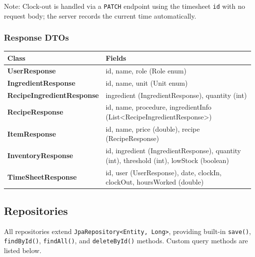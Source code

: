 \documentclass[12pt]{article}
\newcommand{\headerrow}{\rowcolor{darkblue}\color{white}\bfseries}
\begin{document}
\textcolor{midgray}{\small Note: Clock-out is handled via a \texttt{PATCH} endpoint using the timesheet \texttt{id} with no request body; the server records the current time automatically.}

\vspace{1em}

\subsubsection*{Response DTOs}

\begin{longtable}{>{\bfseries\ttfamily}p{5.2cm} p{8cm}}
\toprule
\headerrow Class & Fields \\
\midrule
\endhead
\rowcolor{lightgray} UserResponse & id, name, role (Role enum) \\
IngredientResponse & id, name, unit (Unit enum) \\
\rowcolor{lightgray} RecipeIngredientResponse & ingredient (IngredientResponse), quantity (int) \\
RecipeResponse & id, name, procedure, ingredientInfo (List\textless RecipeIngredientResponse\textgreater) \\
\rowcolor{lightgray} ItemResponse & id, name, price (double), recipe (RecipeResponse) \\
InventoryResponse & id, ingredient (IngredientResponse), quantity (int), threshold (int), lowStock (boolean) \\
\rowcolor{lightgray} TimeSheetResponse & id, user (UserResponse), date, clockIn, clockOut, hoursWorked (double) \\
\bottomrule
\end{longtable}

\subsection{Repositories}

All repositories extend \texttt{JpaRepository\textless Entity, Long\textgreater}, providing built-in
\texttt{save()}, \texttt{findById()}, \texttt{findAll()}, and \texttt{deleteById()} methods.
Custom query methods are listed below.
\end{document}
